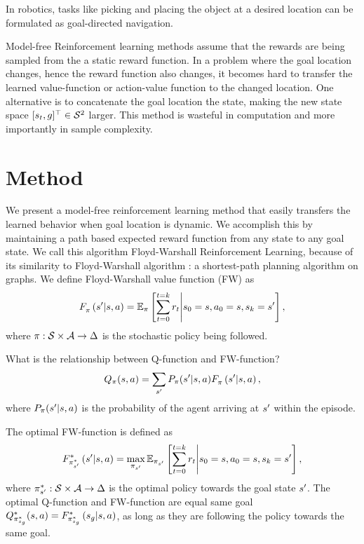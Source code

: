 In robotics, tasks like picking and placing the object at a desired
location can be formulated as goal-directed navigation.

Model-free Reinforcement learning methods assume that the rewards are
being sampled from the a static reward function.  In a problem where the
goal location changes, hence the reward function also changes, it
becomes hard to transfer the learned value-function or action-value
function to the changed location.  One alternative is to concatenate the
goal location the state, making the new state space $[\state_t,
\goal]^\top \in \State^2$ larger.  This method is wasteful in
computation and more importantly in sample complexity.

\section{Method}
We present a model-free reinforcement learning method that easily transfers the
learned behavior when goal location is dynamic. We accomplish this by
maintaining a path based expected reward function from any state to any goal
state. We call this algorithm Floyd-Warshall Reinforcement Learning, because of
its similarity to Floyd-Warshall algorithm : a shortest-path planning algorithm
on graphs. We define Floyd-Warshall value function (FW) as
%
\begin{align}
\fwargs{\state}{\act}{\state'}{\policy}{} =
\E_{\policy}\left[ \sum_{t=0}^{t=k} \rew_t \middle\vert \state_0 = \state, \act_0 = \state, \state_k = \state' \right] ,
\end{align}%
%
where $\policy: \State \times \Action \rightarrow \Delta$ is the
stochastic policy being followed.

What is the relationship between Q-function and FW-function?
\begin{align}
  \Q_\policy(\state, \act) = \sum_{\state'} P_\policy(\state' | \state, \act) \fwargs{\state}{\act}{\state'}{\policy}{},
\end{align}%
%
where $P_\policy(\state' | \state, \act)$ is the probability of the agent
arriving at $\state'$ within the episode.

The optimal FW-function is defined as
\begin{align}
\fwargs{\state}{\act}{\state'}{\policy^*_{\state'}}{*} =
\max_{\policy_{\state'}}\E_{\policy_{\state'}}\left[ \sum_{t=0}^{t=k} \rew_t \middle\vert \state_0 = \state, \act_0 = \state, \state_k = \state' \right] ,
\end{align}%
where $\policy^*_{\state'}: \State \times \Action \rightarrow \Delta$ is the
optimal policy towards the goal state $\state'$. The
optimal Q-function and FW-function are equal same goal
  $\Q^*_{\policy^*_{\state_g}}(\state, \act) =
  \fwargs{\state}{\act}{\state_g}{\policy^*_{\state_g}}{*}$, as long as they are
  following the policy towards the same goal.

